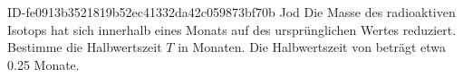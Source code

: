\begin{exercise}
      {ID-fe0913b3521819b52ec41332da42c059873bf70b}
      {Jod}
  \ifproblem\problem
    Die Masse des radioaktiven Isotops  hat sich innerhalb
    eines Monats auf  des ursprünglichen Wertes reduziert.
    Bestimme die Halbwertszeit $T$ in Monaten.
  \fi
  \ifoutcome\outcome
    Die Halbwertszeit von  beträgt etwa \num{0.25} Monate.
  \fi
\end{exercise}
